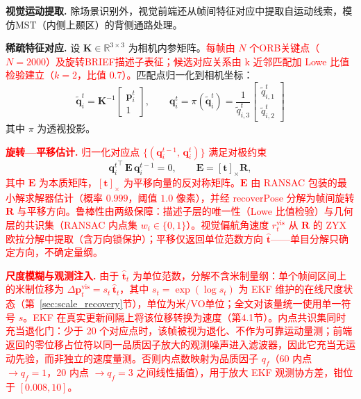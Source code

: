 \textbf{视觉运动提取.} 除场景识别外，视觉前端还从帧间特征对应中提取自运动线索，模仿MST（内侧上颞区）的背侧通路处理。

\textbf{稀疏特征对应.} 设 $\mathbf{K}\in\mathbb{R}^{3\times 3}$ 为相机内参矩阵。\textcolor{red}{每帧由 $N$ 个ORB关键点（$N{=}2000$）及旋转BRIEF描述子表征；候选对应关系由 k 近邻匹配加 Lowe 比值检验建立（$k{=}2$，比值 $0.7$）。}匹配点归一化到相机坐标：
\begin{equation}
    \tilde{\mathbf{q}}_i^t = \mathbf{K}^{-1}\begin{bmatrix}\mathbf{p}_i^t\\ 1\end{bmatrix},\qquad \mathbf{q}_i^t = \pi(\tilde{\mathbf{q}}_i^t)=\frac{1}{\tilde{q}_{i,3}^t}\begin{bmatrix}\tilde{q}_{i,1}^t\\ \tilde{q}_{i,2}^t\end{bmatrix}
\end{equation}
其中 $\pi$ 为透视投影。

\textcolor{red}{\textbf{旋转—平移估计.} 归一化对应点 $\{(\mathbf{q}_i^{t-1},\,\mathbf{q}_i^{t})\}$ 满足对极约束}
\begin{equation}
    {\mathbf{q}_i^{t}}^{\top}\,\mathbf{E}\,\mathbf{q}_i^{t-1}=0,\qquad \mathbf{E}=[\mathbf{t}]_{\times}\mathbf{R},
\end{equation}
\textcolor{red}{其中 $\mathbf{E}$ 为本质矩阵，$[\mathbf{t}]_{\times}$ 为平移向量的反对称矩阵。$\mathbf{E}$ 由 RANSAC 包装的最小解求解器估计（概率 $0.999$，阈值 $1.0$ 像素），并经 $\mathrm{recoverPose}$ 分解为帧间旋转 $\mathbf{R}$ 与平移方向。鲁棒性由两级保障：描述子层的唯一性（Lowe 比值检验）与几何层的共识集（RANSAC 内点集 $w_i\in\{0,1\}$）。视觉偏航角速度 $r_t^{\mathrm{vis}}$ 从 $\mathbf{R}$ 的 ZYX 欧拉分解中提取（含万向锁保护）；平移仅返回单位范数方向 $\hat{\mathbf{t}}$——单目分解只确定方向，不确定量纲。}

\textcolor{red}{\textbf{尺度模糊与观测注入.} 由于 $\hat{\mathbf{t}}_t$ 为单位范数，分解不含米制量纲：单个帧间区间上的米制位移为 $\Delta\mathbf{p}^{\mathrm{vis}}_t = s_t\,\hat{\mathbf{t}}_t$，其中 $s_t = \exp(\log s_t)$ 为 EKF 维护的在线尺度状态（第~\ref{sec:scale_recovery}节），单位为米/VO单位；全文对该量统一使用单一符号 $s$。EKF 在真实更新间隔上将该位移转换为速度（第4.1节）。内点共识集同时充当退化门：少于 20 个对应点时，该帧被视为退化、不作为可靠运动量测；前端返回的零位移占位符以同一品质因子放大的观测噪声进入滤波器，因此它充当无运动先验，而非独立的速度量测。否则内点数映射为品质因子 $q_f$（60 内点 $\to q_f{=}1$，20 内点 $\to q_f{=}3$ 之间线性插值），用于放大 EKF 观测协方差，钳位于 $[0.008,10]$。}

